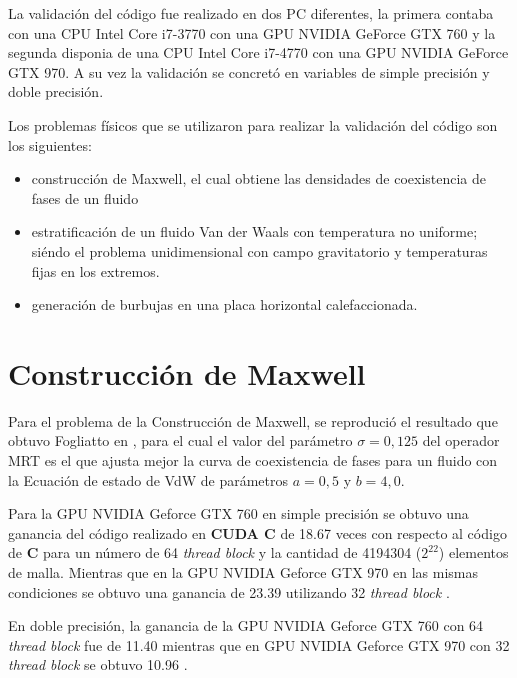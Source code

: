 La validación del código fue realizado en dos PC diferentes, la primera contaba con una CPU Intel Core i7-3770 con una GPU NVIDIA GeForce GTX 760 y la segunda disponia de una CPU Intel Core i7-4770 con una GPU NVIDIA GeForce GTX 970. A su vez la validación se concretó en variables de simple precisión y doble precisión.

Los problemas físicos  que se utilizaron para realizar la validación del código son los siguientes:

\begin{itemize}
    
    \item construcción de Maxwell, el cual obtiene las densidades de coexistencia de fases de un fluido 

    \item estratificación de un fluido Van der Waals con temperatura no uniforme; siéndo el problema unidimensional con campo gravitatorio y temperaturas fijas en los extremos.

    \item generación de burbujas en una placa horizontal calefaccionada.

\end{itemize}

\section{Construcción de Maxwell}

Para el problema de la Construcción de Maxwell, se reprodució el resultado que obtuvo Fogliatto en \cite{fogliatto2019simulation}, para el cual el valor del parámetro $\sigma = 0,125$ del operador MRT es el que ajusta mejor la curva de coexistencia de fases para un fluido con la Ecuación de estado de VdW de parámetros $ a = 0,5 $ y $ b = 4,0 $. 

Para la GPU NVIDIA Geforce GTX 760 en simple precisión se obtuvo una ganancia del código realizado en \textbf{CUDA C} de 18.67 veces con respecto al código de \textbf{C} para un número de 64 \textit{thread block} y la cantidad de 4194304 ($2^{22}$) elementos de malla. Mientras que en la  GPU NVIDIA Geforce GTX 970 en las mismas condiciones se obtuvo una ganancia de 23.39 utilizando 32 \textit{thread block} .

En doble precisión, la ganancia de la GPU NVIDIA Geforce GTX 760 con 64 \textit{thread block} fue de 11.40 mientras que en GPU NVIDIA Geforce GTX 970 con 32 \textit{thread block} se obtuvo 10.96 .

